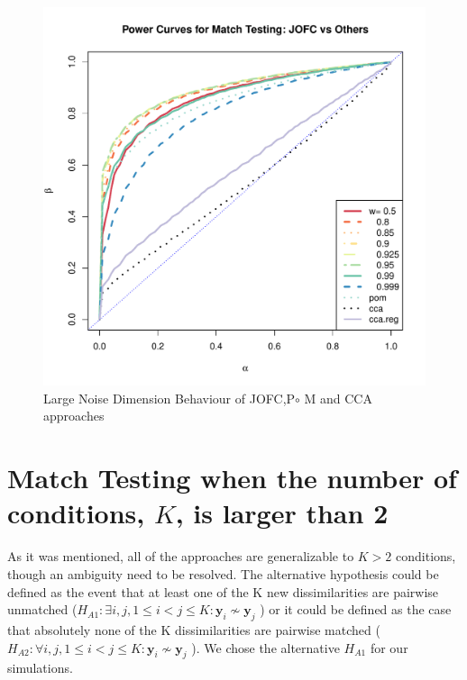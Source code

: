 \documentclass[12pt,oneside,final]{thesis}\usepackage[]{graphicx}\usepackage[]{color}
\begin{document}
\begin{figure}
\includegraphics[scale=0.8]{MVN_JOFC_q_90_c_0_001}
\caption{Large Noise Dimension Behaviour of JOFC,P$\circ$ M and CCA approaches}
\label{fig:largeq}
\end{figure}


\section{Match Testing when the number of\\ conditions, $K$, is larger than 2\label{k_more_than_two_experiment}}


As it was mentioned, all of the approaches are generalizable to $K>2$ conditions, though an ambiguity need to be resolved. The alternative hypothesis could be  defined as the event that at least one of the K new dissimilarities are pairwise unmatched ($ H_{A1}: \exists i, j , 1\leq i < j \leq K :\bm{y}_{i} \nsim \bm{y}_{j} $ ) or it could be defined as the case that absolutely none of the K dissimilarities are pairwise matched   ($H_{A2}: \forall i, j , 1\leq i < j \leq K :\bm{y}_{i} \nsim \bm{y}_{j}$ ). We chose the alternative   $ H_{A1}$ for our simulations.
\end{document}
